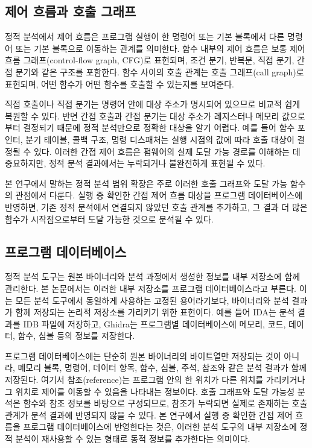 \documentclass[master,korean,final]{kaist-ucs}
\begin{document}
\subsection{제어 흐름과 호출 그래프}

정적 분석에서 제어 흐름은 프로그램 실행이 한 명령어 또는 기본 블록에서 다른 명령어 또는 기본 블록으로 이동하는 관계를 의미한다. 함수 내부의 제어 흐름은 보통 제어 흐름 그래프(control-flow graph, CFG)로 표현되며, 조건 분기, 반복문, 직접 분기, 간접 분기와 같은 구조를 포함한다. 함수 사이의 호출 관계는 호출 그래프(call graph)로 표현되며, 어떤 함수가 어떤 함수를 호출할 수 있는지를 보여준다.

직접 호출이나 직접 분기는 명령어 안에 대상 주소가 명시되어 있으므로 비교적 쉽게 복원할 수 있다. 반면 간접 호출과 간접 분기는 대상 주소가 레지스터나 메모리 값으로부터 결정되기 때문에 정적 분석만으로 정확한 대상을 알기 어렵다. 예를 들어 함수 포인터, 분기 테이블, 콜백 구조, 명령 디스패처는 실행 시점의 값에 따라 호출 대상이 결정될 수 있다. 이러한 간접 제어 흐름은 펌웨어의 실제 도달 가능 경로를 이해하는 데 중요하지만, 정적 분석 결과에서는 누락되거나 불완전하게 표현될 수 있다.

본 연구에서 말하는 정적 분석 범위 확장은 주로 이러한 호출 그래프와 도달 가능 함수의 관점에서 다룬다. 실행 중 확인한 간접 제어 흐름 대상을 프로그램 데이터베이스에 반영하면, 기존 정적 분석에서 연결되지 않았던 호출 관계를 추가하고, 그 결과 더 많은 함수가 시작점으로부터 도달 가능한 것으로 분석될 수 있다.

\subsection{프로그램 데이터베이스}

정적 분석 도구는 원본 바이너리와 분석 과정에서 생성한 정보를 내부 저장소에 함께 관리한다. 본 논문에서는 이러한 내부 저장소를 프로그램 데이터베이스라고 부른다. 이는 모든 분석 도구에서 동일하게 사용하는 고정된 용어라기보다, 바이너리와 분석 결과가 함께 저장되는 논리적 저장소를 가리키기 위한 표현이다. 예를 들어 IDA는 분석 결과를 IDB 파일에 저장하고, Ghidra는 프로그램별 데이터베이스에 메모리, 코드, 데이터, 함수, 심볼 등의 정보를 저장한다.

프로그램 데이터베이스에는 단순히 원본 바이너리의 바이트열만 저장되는 것이 아니라, 메모리 블록, 명령어, 데이터 항목, 함수, 심볼, 주석, 참조와 같은 분석 결과가 함께 저장된다. 여기서 참조(reference)는 프로그램 안의 한 위치가 다른 위치를 가리키거나 그 위치로 제어를 이동할 수 있음을 나타내는 정보이다. 호출 그래프와 도달 가능성 분석은 함수와 참조 정보를 바탕으로 구성되므로, 참조가 누락되면 실제로 존재하는 호출 관계가 분석 결과에 반영되지 않을 수 있다. 본 연구에서 실행 중 확인한 간접 제어 흐름을 프로그램 데이터베이스에 반영한다는 것은, 이러한 분석 도구의 내부 저장소에 정적 분석이 재사용할 수 있는 형태로 동적 정보를 추가한다는 의미이다.
\end{document}
